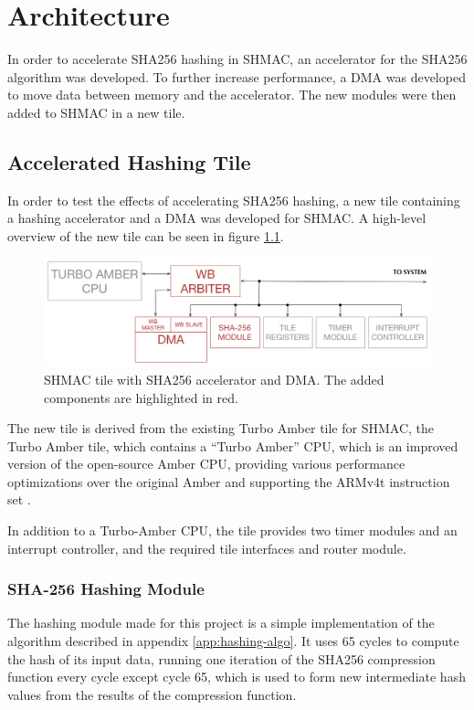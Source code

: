 \chapter{Architecture}
\label{cha:architecture}

In order to accelerate SHA256 hashing in SHMAC, an accelerator for the SHA256 algorithm
was developed. To further increase performance, a DMA was developed to move data between
memory and the accelerator. The new modules were then added to SHMAC in a new tile.

\section{Accelerated Hashing Tile}
\label{sec:aht}

In order to test the effects of accelerating SHA256 hashing, a new tile containing a hashing
accelerator and a DMA was developed for SHMAC. A high-level overview of the new tile can be
seen in figure \ref{fig:SHA-Tile}.

\begin{figure}[htb]
    \centering
    \includegraphics[width=1.0\textwidth]{Figures/Tile/HashingTile}
    \caption{SHMAC tile with SHA256 accelerator and DMA. The added components are highlighted in red.}
    \label{fig:SHA-Tile}
\end{figure}

The new tile is derived from the existing Turbo Amber tile for SHMAC, the Turbo Amber tile, which contains
a ``Turbo Amber'' CPU, which is an improved version of the open-source Amber CPU, providing various
performance optimizations over the original Amber and supporting the ARMv4t instruction set \cite{turboamber}.

In addition to a Turbo-Amber CPU, the tile provides two timer modules and an interrupt controller,
and the required tile interfaces and router module.

\subsection{SHA-256 Hashing Module}
The hashing module made for this project is a simple implementation of the algorithm described in
appendix \ref{app:hashing-algo}. It uses 65 cycles to compute the hash of its input data, running
one iteration of the SHA256 compression function every cycle except cycle 65, which is used to
form new intermediate hash values from the results of the compression function.

